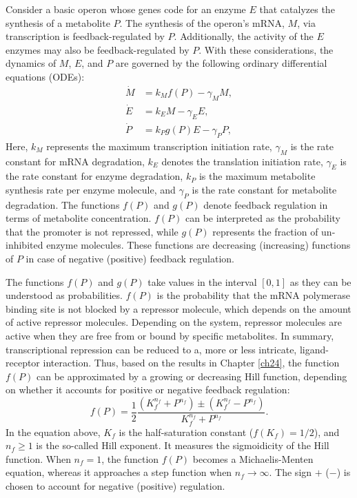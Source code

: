 Consider a basic operon whose genes code for an enzyme $E$ that catalyzes the synthesis of a metabolite $P$. The synthesis of the operon's mRNA, $M$, via transcription is feedback-regulated by $P$. Additionally, the activity of the $E$ enzymes may also be feedback-regulated by $P$. With these considerations, the dynamics of $M$, $E$, and $P$ are governed by the following ordinary differential equations (ODEs):
\begin{align}
\dot{M} &= k_M f(P) - \gamma_M M, \label{eq:27.01}\\
\dot{E} &= k_E M - \gamma_E E,\label{eq:27.02}\\
\dot{P} &= k_P g(P) E - \gamma_P P, \label{eq:27.03}
\end{align}
Here, $k_M$ represents the maximum transcription initiation rate, $\gamma_M$ is the rate constant for mRNA degradation, $k_E$ denotes the translation initiation rate, $\gamma_E$ is the rate constant for enzyme degradation, $k_P$ is the maximum metabolite synthesis rate per enzyme molecule, and $\gamma_P$ is the rate constant for metabolite degradation. The functions $f(P)$ and $g(P)$ denote feedback regulation in terms of metabolite concentration. $f(P)$ can be interpreted as the probability that the promoter is not repressed, while $g(P)$ represents the fraction of un-inhibited enzyme molecules. These functions are decreasing (increasing) functions of $P$ in case of negative (positive) feedback regulation.

The functions $f(P)$ and $g(P)$ take values in the interval $[0, 1]$ as they can be understood as probabilities. $f(P)$ is the probability that the mRNA polymerase binding site is not blocked by a repressor molecule, which depends on the amount of active repressor molecules. Depending on the system, repressor molecules are active when they are free from or bound by specific metabolites. In summary, transcriptional repression can be reduced to a, more or less intricate, ligand-receptor interaction. Thus, based on the results in Chapter \ref{ch24}, the function $f(P)$ can be approximated by a growing or decreasing Hill function, depending on whether it accounts for positive or negative feedback regulation:
\begin{equation*}
f(P)=\frac{1}{2} \frac{(K_f^{n_f}+P^{n_f})\pm(K_f^{n_f}-P^{n_f})}{K_f^{n_f}+P^{n_f}}.
\end{equation*}
In the equation above, $K_f$ is the half-saturation constant ($f(K_f)=1/2$), and $n_f \geq 1$ is the so-called Hill exponent. It measures the sigmoidicity of the Hill function. When $n_f=1$, the function $f(P)$ becomes a Michaelis-Menten equation, whereas it approaches a step function when $n_f \to \infty$. The sign $+$ ($-$) is chosen to account for negative (positive) regulation.

